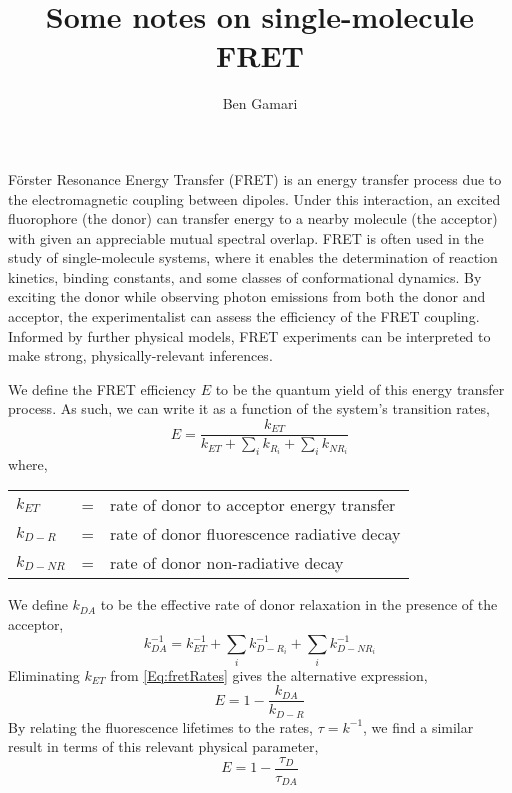 \documentclass{article}
\title{Some notes on single-molecule FRET}
\author{Ben Gamari}
\begin{document}
\maketitle

F\"orster Resonance Energy Transfer (FRET) is an energy transfer
process due to the electromagnetic coupling between dipoles. Under
this interaction, an excited fluorophore (the donor) can transfer energy
to a nearby molecule (the acceptor) with given an appreciable mutual
spectral overlap. FRET is often used in the study of single-molecule
systems, where it enables the determination of reaction kinetics,
binding constants, and some classes of conformational dynamics.
By exciting the donor while observing photon emissions from both the
donor and acceptor, the experimentalist can assess the efficiency of
the FRET coupling. Informed by further physical models, FRET
experiments can be interpreted to make strong, physically-relevant
inferences.

We define the FRET efficiency $E$ to be the quantum yield of this
energy transfer process. As such, we can write it as a function of the
system's transition rates,
\begin{equation}
  E = \frac{k_{ET}}{k_{ET} + \sum_i k_{R_i} + \sum_i k_{NR_i}}
  \label{Eq:fretRates}
\end{equation}
where,

\begin{tabular}{lcl}
  $k_{ET}$  & = & rate of donor to acceptor energy transfer \\
  $k_{D-R}$   & = & rate of donor fluorescence radiative decay \\
  $k_{D-NR}$  & = & rate of donor non-radiative decay \\
\end{tabular}

We define $k_{DA}$ to be the effective rate of donor relaxation in the presence
of the acceptor,
\[ k_{DA}^{-1} = k_{ET}^{-1} + \sum_i k_{D-R_i}^{-1} + \sum_i k_{D-NR_i}^{-1} \]
Eliminating $k_{ET}$ from \eqref{Eq:fretRates} gives the alternative expression,
\begin{equation}
  E = 1 - \frac{k_{DA}}{k_{D-R}} \label{Eq:fretEffRates}
\end{equation}
By relating the fluorescence lifetimes to the rates, $\tau = k^{-1}$,
we find a similar result in terms of this relevant physical parameter,
\begin{equation}
  E = 1 - \frac{\tau_{D}}{\tau_{DA}} \label{Eq:fretEffTau}
\end{equation}
\end{document}
